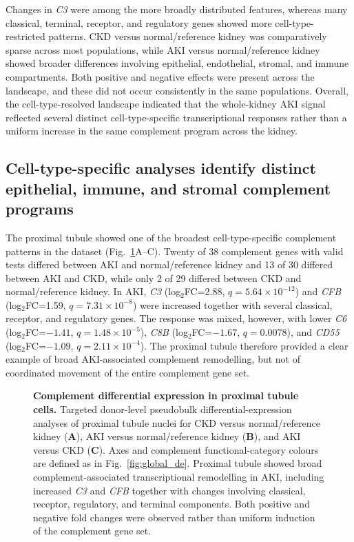\documentclass[10pt,letterpaper]{article}
\begin{document}
Changes in \textit{C3} were among the more broadly distributed features, whereas many classical, terminal, receptor, and regulatory genes showed more cell-type-restricted patterns. CKD versus normal/reference kidney was comparatively sparse across most populations, while AKI versus normal/reference kidney showed broader differences involving epithelial, endothelial, stromal, and immune compartments. Both positive and negative effects were present across the landscape, and these did not occur consistently in the same populations. Overall, the cell-type-resolved landscape indicated that the whole-kidney AKI signal reflected several distinct cell-type-specific transcriptional responses rather than a uniform increase in the same complement program across the kidney.


\subsection*{Cell-type-specific analyses identify distinct epithelial, immune, and stromal complement programs}

The proximal tubule showed one of the broadest cell-type-specific complement patterns in the dataset (Fig.~\ref{fig:pt_de}A--C). Twenty of 38 complement genes with valid tests differed between AKI and normal/reference kidney and 13 of 30 differed between AKI and CKD, while only 2 of 29 differed between CKD and normal/reference kidney. In AKI, \textit{C3} (log$_2$FC=2.88, $q=5.64\times10^{-12}$) and \textit{CFB} (log$_2$FC=1.59, $q=7.31\times10^{-8}$) were increased together with several classical, receptor, and regulatory genes. The response was mixed, however, with lower \textit{C6} (log$_2$FC=$-1.41$, $q=1.48\times10^{-5}$), \textit{C8B} (log$_2$FC=$-1.67$, $q=0.0078$), and \textit{CD55} (log$_2$FC=$-1.09$, $q=2.11\times10^{-4}$). The proximal tubule therefore provided a clear example of broad AKI-associated complement remodelling, but not of coordinated movement of the entire complement gene set.

\begin{figure}[!h]
\caption{\textbf{Complement differential expression in proximal tubule cells.}
Targeted donor-level pseudobulk differential-expression analyses of proximal tubule nuclei for CKD versus normal/reference kidney (\textbf{A}), AKI versus normal/reference kidney (\textbf{B}), and AKI versus CKD (\textbf{C}). Axes and complement functional-category colours are defined as in Fig.~\ref{fig:global_de}. Proximal tubule showed broad complement-associated transcriptional remodelling in AKI, including increased \textit{C3} and \textit{CFB} together with changes involving classical, receptor, regulatory, and terminal components. Both positive and negative fold changes were observed rather than uniform induction of the complement gene set.}
\label{fig:pt_de}
\end{figure}
\end{document}
